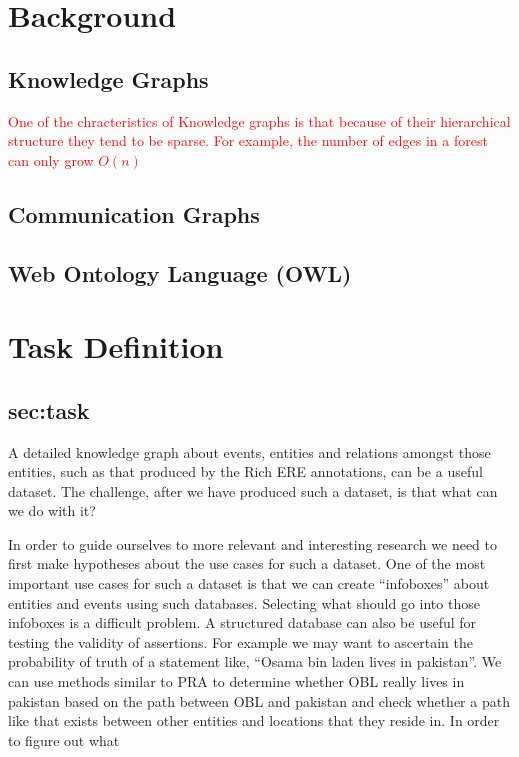 \documentclass{tufte-handout}
\newcommand{\alert}[1]{\textcolor{red}{#1}}
\begin{document}
\section{Background}
\label{sec:background}
\subsection{Knowledge Graphs}
\label{sec:knowledge-graphs}
\alert{One of the chracteristics of Knowledge graphs is that because of their
  hierarchical structure they tend to be sparse. For example, the number of
  edges in a forest can only grow $O(n)$}


\subsection{Communication Graphs}
\label{sec:communication-graphs}



\subsection{Web Ontology Language (OWL)}
\label{sec:web-ontol-lang}


\section{Task Definition}
\subsection{sec:task}
A detailed knowledge graph about events, entities and relations amongst those
entities, such as that produced by the Rich ERE annotations, can be a useful
dataset. The challenge, after we have produced such a dataset, is that what can
we do with it?

In order to guide ourselves to more relevant and interesting research we need to first make hypotheses about the use cases for such a dataset. One of the most important use cases for such a dataset is that we can create ``infoboxes'' about entities and events using such databases. Selecting what should go into those infoboxes is a difficult problem. A structured database can also be useful for testing the validity of assertions. For example we may want to ascertain the probability of truth of a statement like, ``Osama bin laden lives in pakistan''. We can use methods similar to PRA to determine whether
OBL really lives in pakistan based on the path between OBL and pakistan and check whether a path like that exists between other entities and locations that they reside in.
In order to figure out what
\end{document}
